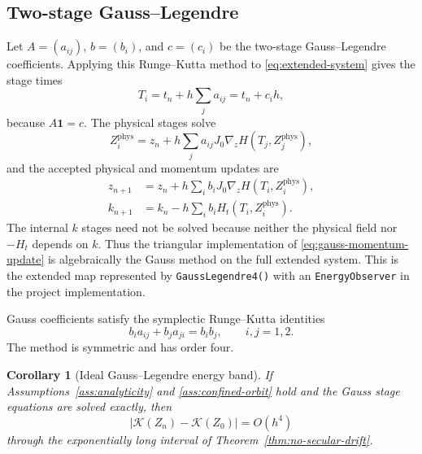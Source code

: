 \documentclass[11pt,a4paper]{article}
\newtheorem{corollary}[theorem]{Corollary}
\theoremstyle{definition}
\theoremstyle{remark}
\newcommand{\K}{\mathcal{K}}
\newcommand{\abs}[1]{\left\lvert #1\right\rvert}
\begin{document}
\subsection{Two-stage Gauss--Legendre}

Let $A=(a_{ij})$, $b=(b_i)$, and $c=(c_i)$ be the two-stage Gauss--Legendre
coefficients.  Applying this Runge--Kutta method to
\eqref{eq:extended-system} gives the stage times
\begin{equation}
 T_i=t_n+h\sum_j a_{ij}=t_n+c_ih,
 \label{eq:gauss-stage-times}
\end{equation}
because $A\mathbf{1}=c$.  The physical stages solve
\begin{equation}
 Z_i^{\mathrm{phys}}
 =z_n+h\sum_j a_{ij}
 J_0\nabla_zH(T_j,Z_j^{\mathrm{phys}}),
 \label{eq:gauss-physical-stages}
\end{equation}
and the accepted physical and momentum updates are
\begin{align}
 z_{n+1}
 &=z_n+h\sum_i b_iJ_0\nabla_zH(T_i,Z_i^{\mathrm{phys}}),
 \label{eq:gauss-physical-update}\\
 k_{n+1}
 &=k_n-h\sum_i b_iH_t(T_i,Z_i^{\mathrm{phys}}).
 \label{eq:gauss-momentum-update}
\end{align}
The internal $k$ stages need not be solved because neither the physical field
nor $-H_t$ depends on $k$.  Thus the triangular implementation of
\eqref{eq:gauss-momentum-update} is algebraically the Gauss method on the full
extended system.  This is the extended map represented by
\texttt{GaussLegendre4()} with an \texttt{EnergyObserver} in the project implementation.

Gauss coefficients satisfy the symplectic Runge--Kutta identities
\begin{equation}
 b_i a_{ij}+b_j a_{ji}=b_ib_j,
 \qquad i,j=1,2.
 \label{eq:gauss-symplectic-condition}
\end{equation}
The method is symmetric and has order four.

\begin{corollary}[Ideal Gauss--Legendre energy band]
\label{cor:gauss-energy-band}
If Assumptions~\ref{ass:analyticity} and \ref{ass:confined-orbit} hold and the
Gauss stage equations are solved exactly, then
\begin{equation}
 \abs{\K(Z_n)-\K(Z_0)}=O(h^4)
 \label{eq:gauss-energy-band}
\end{equation}
through the exponentially long interval of
Theorem~\ref{thm:no-secular-drift}.
\end{corollary}
\end{document}
